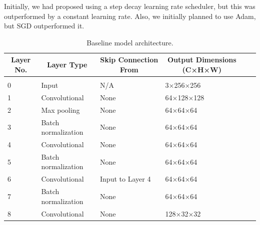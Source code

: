 \documentclass{article} %
\begin{document}
Initially, we had proposed using a step decay learning rate scheduler, but this was outperformed by a constant learning rate. Also, we initially planned to use Adam, but SGD outperformed it.

\begin{table}[t]
    \caption{Baseline model architecture.}
    \label{baseline_arch}
    \begin{center}
        \begin{tabular}{llllll}
            \multicolumn{1}{c}{\bf Layer No.} & \multicolumn{1}{c}{\bf Layer Type} & \multicolumn{1}{c}{\bf Skip Connection From} & \multicolumn{1}{c}{\bf Output Dimensions (C×H×W)}
            \\ \hline \\
            0                                 & Input                              & N/A                                          & 3×256×256                                         \\
            1                                 & Convolutional                      & None                                         & 64×128×128                                        \\
            2                                 & Max pooling                        & None                                         & 64×64×64                                          \\
            3                                 & Batch normalization                & None                                         & 64×64×64                                          \\
            4                                 & Convolutional                      & None                                         & 64×64×64                                          \\
            5                                 & Batch normalization                & None                                         & 64×64×64                                          \\
            6                                 & Convolutional                      & Input to Layer 4                             & 64×64×64                                          \\
            7                                 & Batch normalization                & None                                         & 64×64×64                                          \\
            8                                 & Convolutional                      & None                                         & 128×32×32                                         \\

\end{tabular}
\end{center}
\end{table}
\end{document}
